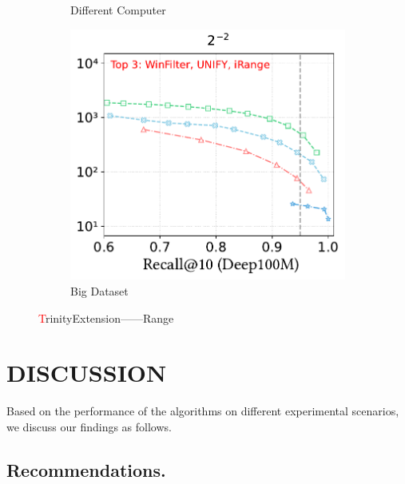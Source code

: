 \documentclass[sigconf, nonacm]{acmart}
\begin{document}
\begin{figure}[t]
\begin{subfigure}[t]{0.315\columnwidth}
			\caption{\footnotesize Different Computer}
			\label{fig:Different Computer range}
		\end{subfigure}
		\hfill
		\begin{subfigure}[t]{0.315\columnwidth}
			\centering
			\includegraphics[width=\linewidth]{figures/exp/range_deep100M.pdf}
			\caption{\footnotesize Big Dataset}
			\label{fig:Big Dataset range}
		\end{subfigure}
		
		
		\caption{\textcolor{red}TrinityExtension——Range}
		\label{fig:TrinityExtension——Range}
	\end{figure}
	
	
	\section{DISCUSSION}
	Based on the performance of the algorithms on different experimental scenarios, we discuss our findings as follows.
	
	
	\subsection{Recommendations.}
	
\end{document}
